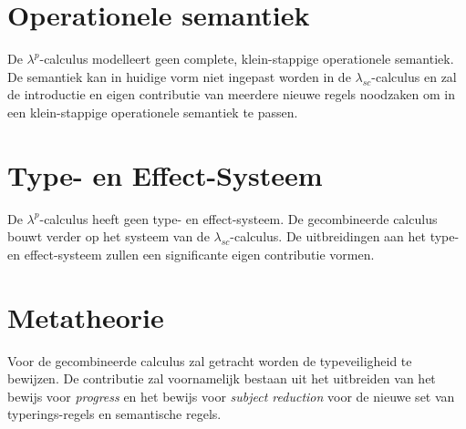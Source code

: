 \section{Operationele semantiek}
De $\lambda^p$-calculus modelleert geen complete, klein-stappige operationele semantiek. De semantiek kan in huidige vorm niet ingepast worden in de $\lambda_{sc}$-calculus en zal de introductie en eigen contributie van meerdere nieuwe regels noodzaken om in een klein-stappige operationele semantiek te passen.

\section{Type- en Effect-Systeem}
De $\lambda^p$-calculus heeft geen type- en effect-systeem. De gecombineerde calculus bouwt verder op het systeem van de $\lambda_{sc}$-calculus. De uitbreidingen aan het type- en effect-systeem zullen een significante eigen contributie vormen. 

\section{Metatheorie}
Voor de gecombineerde calculus zal getracht worden de typeveiligheid te bewijzen. De contributie zal voornamelijk bestaan uit het uitbreiden van het bewijs voor \emph{progress} en het bewijs voor \emph{subject reduction} voor de nieuwe set van typerings-regels en semantische regels.





